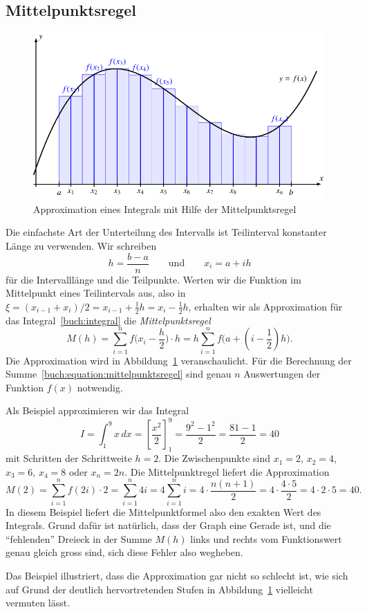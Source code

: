 \subsection{Mittelpunktsregel
\label{buch:subsection:mittelpunkt}}
\begin{figure}
\centering
\includegraphics{chapters/40-integration/figures/mittelpunkt.pdf}
\caption{Approximation eines Integrals mit Hilfe der Mittelpunktsregel
\label{buch:figure:mittelpunkt}}
\end{figure}
Die einfachste Art der Unterteilung des Intervalls ist Teilinterval
konstanter Länge zu verwenden. 
Wir schreiben
\[
h = \frac{b-a}n
\qquad\text{und}\qquad
x_i = a + ih
\]
für die Intervalllänge und die Teilpunkte.
Werten wir die Funktion im Mittelpunkt eines Teilintervals aus, also
in $\xi = (x_{i-1}+x_i)/2 = x_{i-1}+\frac12h = x_i -\frac12h$,
erhalten wir als Approximation für das Integral~\eqref{buch:integral}
die {\em Mittelpunktsregel}
\begin{equation}
M(h)
=
\sum_{i=1}^n f\biggl(x_i - \frac{h}2\biggr) \cdot h
=
h
\sum_{i=1}^n f\bigl(a+(i-{\textstyle\frac12})h\bigr).
\label{buch:equation:mittelpunktsregel}
\end{equation}
Die Approximation wird in Abbildung~\ref{buch:figure:mittelpunkt}
veranschaulicht.
Für die Berechnung der Summe~\eqref{buch:equation:mittelpunktsregel}
sind genau $n$ Auswertungen der Funktion $f(x)$ notwendig.

\begin{beispiel}
\label{buch:beispiel:kreis}
Als Beispiel approximieren wir das Integral
\[
I
=
\int_{1}^{9} x\,dx
=
\left[\frac{x^2}2\right]_1^9
=
\frac{9^2-1^2}2=\frac{81-1}2=40
\]
mit Schritten der Schrittweite $h=2$.
Die Zwischenpunkte sind $x_1=2$, $x_2=4$, $x_3=6$, $x_4=8$ oder $x_n=2n$.
Die Mittelpunktregel liefert die Approximation
\[
M(2)
=
\sum_{i=1}^n f(2i) \cdot 2
=
\sum_{i=1}^n 4i
=
4\sum_{i=1}^n i
=
4\cdot \frac{n(n+1)}{2}
=
4\cdot\frac{4\cdot 5}{2}
=
4\cdot 2 \cdot 5
=
40.
\]
In diesem Beispiel liefert die Mittelpunktformel also den exakten Wert
des Integrals.
Grund dafür ist natürlich, dass der Graph eine Gerade ist, und die 
``fehlenden'' Dreieck in der Summe $M(h)$ links und rechts vom
Funktionswert genau gleich gross sind, sich diese Fehler also wegheben.
\end{beispiel}
Das Beispiel illustriert, dass die Approximation gar nicht so schlecht ist,
wie sich auf Grund der deutlich hervortretenden Stufen in
Abbildung~\ref{buch:figure:mittelpunkt} vielleicht vermuten lässt.


